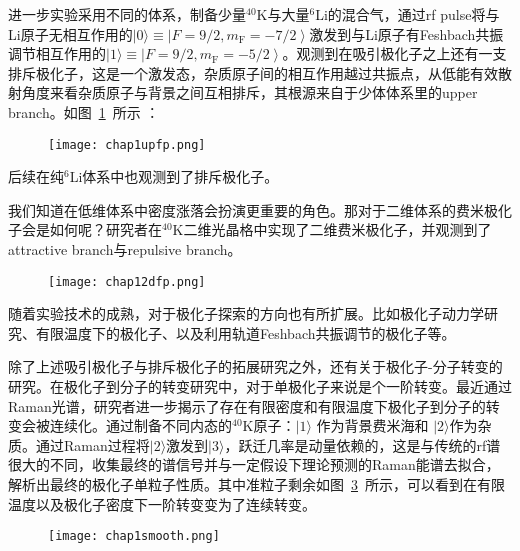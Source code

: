 进一步实验\cite{kohstall2012metastability}采用不同的体系，制备少量${}^{40}$K与大量${}^{6}$Li的混合气，通过rf pulse将与Li原子无相互作用的$|0\rangle\equiv\left|F=9 / 2, m_{\mathrm{F}}=-7 / 2\right\rangle$激发到与Li原子有Feshbach共振调节相互作用的$|1\rangle \equiv\left|F=9 / 2, m_{\mathrm{F}}=-5 / 2\right\rangle$。观测到在吸引极化子之上还有一支排斥极化子，这是一个激发态，杂质原子间的相互作用越过共振点，从低能有效散射角度来看杂质原子与背景之间互相排斥，其根源来自于少体体系里的upper branch。如图~\ref{upfp}~所示 ：
\begin{figure}[!htbp]
    \centering
    \texttt{[image: chap1upfp.png]}
    \label{upfp}
\end{figure}
后续在纯${}^{6}$Li体系中也观测到了排斥极化子\cite{Scazzarepulsive}。

我们知道在低维体系中密度涨落会扮演更重要的角色。那对于二维体系的费米极化子会是如何呢？研究者在${}^{40}$K二维光晶格中实现了二维费米极化子，并观测到了attractive branch与repulsive branch\cite{koschorreck2012attractive}。
\begin{figure}[!htbp]
    \centering
    \texttt{[image: chap12dfp.png]}
    \label{2dfp}
\end{figure}

随着实验技术的成熟，对于极化子探索的方向也有所扩展。比如极化子动力学研究\cite{Cetina2015decoherence,cetina2016ultrafast}、有限温度下的极化子\cite{YanBoiling}、以及利用轨道Feshbach共振调节的极化子等\cite{Darkwah2019}。

除了上述吸引极化子与排斥极化子的拓展研究之外，还有关于极化子-分子转变的研究。在极化子到分子的转变研究中，对于单极化子来说是个一阶转变。最近通过Raman光谱，研究者进一步揭示了存在有限密度和有限温度下极化子到分子的转变会被连续化。通过制备不同内态的${}^{40}$K原子：$|1\rangle$ 作为背景费米海和 $|2\rangle$作为杂质。通过Raman过程将$|2\rangle$激发到$|3\rangle$，跃迁几率是动量依赖的，这是与传统的rf谱很大的不同，收集最终的谱信号并与一定假设下理论预测的Raman能谱去拟合，解析出最终的极化子单粒子性质。其中准粒子剩余如图~\ref{fpsmooth}~所示，可以看到在有限温度以及极化子密度下一阶转变变为了连续转变。
\begin{figure}[!htbp]
    \centering
    \texttt{[image: chap1smooth.png]}
    \label{fpsmooth}
\end{figure}



